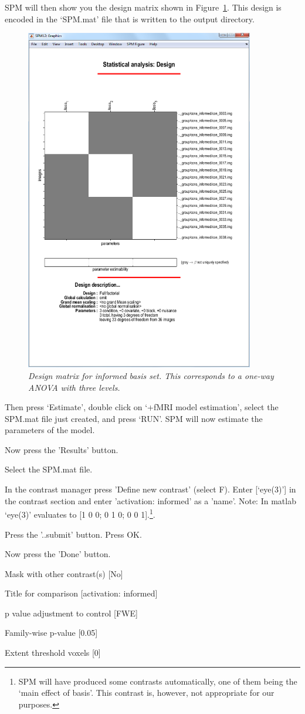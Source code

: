 SPM will then show you the design matrix shown in Figure~\ref{informed_design}. This design is encoded in the `SPM.mat' file that is written to the output directory.
\begin{figure}
\begin{center}
\includegraphics[width=100mm]{faces_group/informed_design}
\caption{\em Design matrix for informed basis set. This corresponds to a one-way ANOVA with three levels. \label{informed_design}}
\end{center}
\end{figure}
Then press `Estimate', double click on `+fMRI model   estimation', select the SPM.mat file just created, and press `RUN'.
SPM will now estimate the parameters of the model.

\bi
\item{Now press the 'Results' button.}
\item{Select the SPM.mat file.}
\item{In the contrast manager press 'Define new contrast' (select F). Enter [`eye(3)'] in the contrast section and enter 'activation: informed' as a 'name'. Note: In matlab `eye(3)' evaluates to [1 0 0; 0 1 0; 0 0 1].\footnote{SPM will have produced some contrasts automatically, one of them being the `main effect of basis'. This contrast is, however, not 
appropriate for our purposes.}.}
\item{Press the '..submit' button. Press OK.}
\item{Now press the 'Done' button.}
\item{Mask with other contrast(s) [No]}
\item{Title for comparison [activation: informed]}
\item{p value adjustment to control [FWE]}
\item{Family-wise p-value [0.05]}
\item{Extent threshold {voxels} [0]}
\ei

